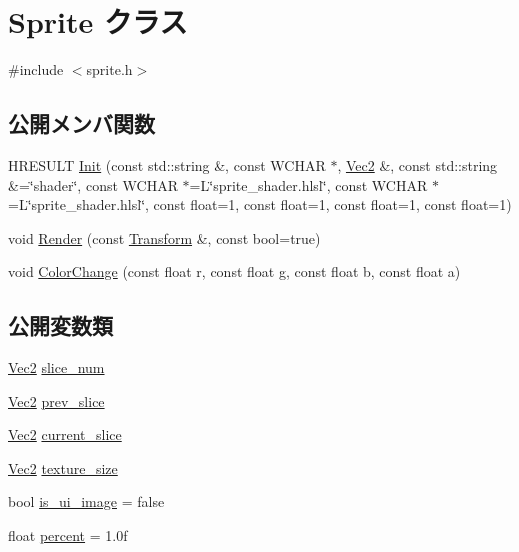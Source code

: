 \hypertarget{class_sprite}{}\section{Sprite クラス}
\label{class_sprite}


{\ttfamily \#include $<$sprite.\+h$>$}

\subsection*{公開メンバ関数}
\begin{DoxyCompactItemize}
\item 
H\+R\+E\+S\+U\+LT \mbox{\hyperlink{class_sprite_a65b9b470731149992bfa7401ffb676ae}{Init}} (const std\+::string \&, const W\+C\+H\+AR $\ast$, \mbox{\hyperlink{common_8h_ae148fff5818e9444b4ab2288829559bf}{Vec2}} \&, const std\+::string \&=\char`\"{}shader\char`\"{}, const W\+C\+H\+AR $\ast$=L\char`\"{}sprite\+\_\+shader.\+hlsl\char`\"{}, const W\+C\+H\+AR $\ast$=L\char`\"{}sprite\+\_\+shader.\+hlsl\char`\"{}, const float=1, const float=1, const float=1, const float=1)
\item 
void \mbox{\hyperlink{class_sprite_a23296a54e3165adbbeb2b5351d04b921}{Render}} (const \mbox{\hyperlink{common_8h_a1c43cb8f0d8a41901f3ce4c67dbbce20}{Transform}} \&, const bool=true)
\item 
void \mbox{\hyperlink{class_sprite_a0a3daa8677d1205981e27bd698025afa}{Color\+Change}} (const float r, const float g, const float b, const float a)
\end{DoxyCompactItemize}
\subsection*{公開変数類}
\begin{DoxyCompactItemize}
\item 
\mbox{\hyperlink{common_8h_ae148fff5818e9444b4ab2288829559bf}{Vec2}} \mbox{\hyperlink{class_sprite_aac62c18a9b678d357f3465d45b2e6ebd}{slice\+\_\+num}}
\item 
\mbox{\hyperlink{common_8h_ae148fff5818e9444b4ab2288829559bf}{Vec2}} \mbox{\hyperlink{class_sprite_a5c96c0e7d46a79740a5fe9e71e9f132b}{prev\+\_\+slice}}
\item 
\mbox{\hyperlink{common_8h_ae148fff5818e9444b4ab2288829559bf}{Vec2}} \mbox{\hyperlink{class_sprite_a7d4903c9693bbb41094b395fe587bf47}{current\+\_\+slice}}
\item 
\mbox{\hyperlink{common_8h_ae148fff5818e9444b4ab2288829559bf}{Vec2}} \mbox{\hyperlink{class_sprite_afb8f3dc3f60aaa09306153d50e4243c9}{texture\+\_\+size}}
\item 
bool \mbox{\hyperlink{class_sprite_ae561a927089192371cff0c1b7402593b}{is\+\_\+ui\+\_\+image}} = false
\item 
float \mbox{\hyperlink{class_sprite_a4e306b23bbc378d1d973ca61084ebd9e}{percent}} = 1.\+0f
\end{DoxyCompactItemize}

